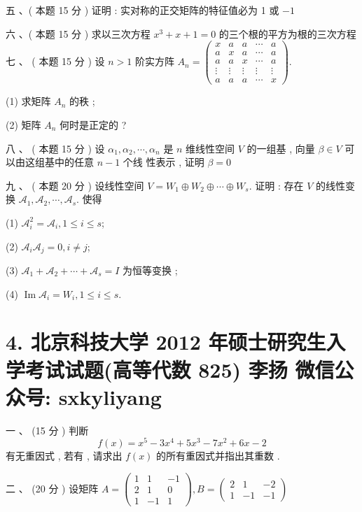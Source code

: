 \documentclass[10pt]{article}
\begin{document}
{\begin{enumerate}
\end{enumerate}
 五 、( 本题  15  分 )  证明 :  实对称的正交矩阵的特征值必为  1  或  $-1$

 六 、( 本题  15  分 )  求以三次方程  $x^{3}+x+1=0$  的三个根的平方为根的三次方程   七 、 ( 本题  15  分 )  设  $n>1$  阶实方阵  $A_{n}=\left(\begin{array}{ccccc}x & a & a & \cdots & a \\ a & x & a & \cdots & a \\ a & a & x & \cdots & a \\ \vdots & \vdots & \vdots & \vdots & \vdots \\ a & a & a & \cdots & x\end{array}\right)$.

(1)  求矩阵  $A_{n}$  的秩 ;

(2)  矩阵  $A_{n}$  何时是正定的 ?

 八 、 ( 本题  15  分 )  设  $\alpha_{1}, \alpha_{2}, \cdots, \alpha_{n}$  是  $n$  维线性空间  $V$  的一组基 ,  向量  $\beta \in V$  可以由这组基中的任意  $n-1$  个线   性表示 ,  证明  $\beta=0$

 九 、 ( 本题  20  分 )  设线性空间  $V=W_{1} \oplus W_{2} \oplus \cdots \oplus W_{s}$.  证明 :  存在  $V$  的线性变换  $\mathscr{A}_{1}, \mathscr{A}_{2}, \cdots, \mathscr{A}_{s}$.  使得 

(1) $\mathscr{A}_{i}^{2}=\mathscr{A}_{i}, 1 \leq i \leq s$;

(2) $\mathscr{A}_{i} \mathscr{A}_{j}=0, i \neq j$;

(3) $\mathscr{A}_{1}+\mathscr{A}_{2}+\cdots+\mathscr{A}_{s}=I$  为恒等变换 ;

(4) $\operatorname{Im} \mathscr{A}_{i}=W_{i}, 1 \leq i \leq s$.

\section{4. 北京科技大学 2012 年硕士研究生入学考试试题(高等代数 825) 
 李扬 
 微信公众号: sxkyliyang}
 一 、 (15  分 )  判断 
$$
f(x)=x^{5}-3 x^{4}+5 x^{3}-7 x^{2}+6 x-2
$$
 有无重因式 ,  若有 ,  请求出  $f(x)$  的所有重因式并指出其重数 .

 二 、 (20  分 )  设矩阵  $A=\left(\begin{array}{ccc}1 & 1 & -1 \\ 2 & 1 & 0 \\ 1 & -1 & 1\end{array}\right), B=\left(\begin{array}{ccc}2 & 1 & -2 \\ 1 & -1 & -1\end{array}\right)$

}
\end{document}

